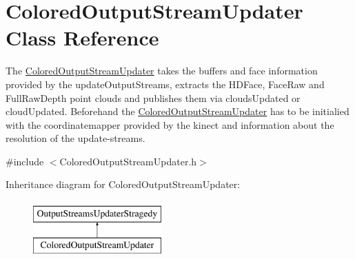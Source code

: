 \hypertarget{class_colored_output_stream_updater}{}\section{Colored\+Output\+Stream\+Updater Class Reference}
\label{class_colored_output_stream_updater}


The \hyperlink{class_colored_output_stream_updater}{Colored\+Output\+Stream\+Updater} takes the buffers and face information provided by the update\+Output\+Streams, extracts the H\+D\+Face, Face\+Raw and Full\+Raw\+Depth point clouds and publishes them via clouds\+Updated or cloud\+Updated. Beforehand the \hyperlink{class_colored_output_stream_updater}{Colored\+Output\+Stream\+Updater} has to be initialied with the coordinatemapper provided by the kinect and information about the resolution of the update-\/streams.  




{\ttfamily \#include $<$Colored\+Output\+Stream\+Updater.\+h$>$}

Inheritance diagram for Colored\+Output\+Stream\+Updater\+:\begin{figure}[H]
\begin{center}
\leavevmode
\includegraphics[height=2.000000cm]{class_colored_output_stream_updater}
\end{center}
\end{figure}

